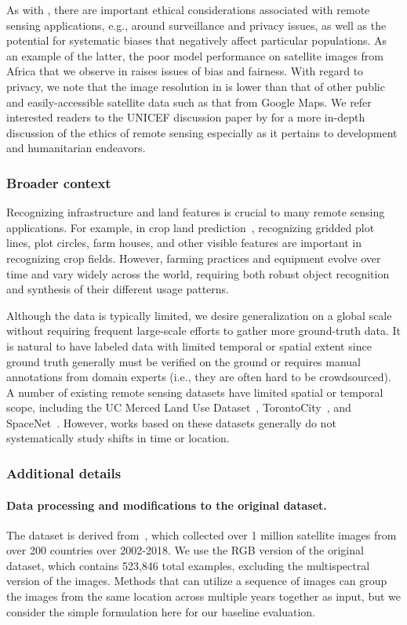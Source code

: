 As with \PovertyMap, there are important ethical considerations associated with remote sensing applications,
e.g., around surveillance and privacy issues, as well as the potential for systematic biases that negatively affect particular populations.
As an example of the latter, the poor model performance on satellite images from Africa that we observe in \FMoW raises issues of bias and fairness.
With regard to privacy, we note that the image resolution in \FMoW is lower than that of other public and easily-accessible satellite data such as that from Google Maps.
We refer interested readers to the UNICEF discussion paper by \citet{berman2018ethical} for a more in-depth discussion of the ethics of remote sensing especially as it pertains to development and humanitarian endeavors.


\subsubsection{Broader context}
Recognizing infrastructure and land features is crucial to many remote sensing applications. For example, in crop land prediction~\cite{wang2020weakly}, recognizing gridded plot lines, plot circles, farm houses, and other visible features are important in recognizing crop fields. However, farming practices and equipment evolve over time and vary widely across the world, requiring both robust object recognition and synthesis of their different usage patterns.

Although the data is typically limited, we desire generalization on a global scale without requiring frequent large-scale efforts to gather more ground-truth data.
It is natural to have labeled data with limited temporal or spatial extent since ground truth generally must be verified on the ground or requires manual annotations from domain experts (i.e., they are often hard to be crowdsourced). A number of existing remote sensing datasets have limited spatial or temporal scope, including the UC Merced Land Use Dataset~\citep{yang2010landuse}, TorontoCity~\citep{wang2017torontocity}, and SpaceNet~\citep{digitalglobe2016spacenet}.
However, works based on these datasets generally do not systematically study shifts in time or location.

\subsubsection{Additional details}\label{sec:app_fmow_details}

\paragraph{Data processing and modifications to the original dataset.}
The \FMoW dataset is derived from~\citet{christie2018fmow}, which collected over 1 million satellite images from over 200 countries over 2002-2018.
We use the RGB version of the original dataset, which contains 523,846 total examples, excluding the multispectral version of the images.
Methods that can utilize a sequence of images can group the images from the same location across multiple years together as input, but we consider the simple formulation here for our baseline evaluation.


